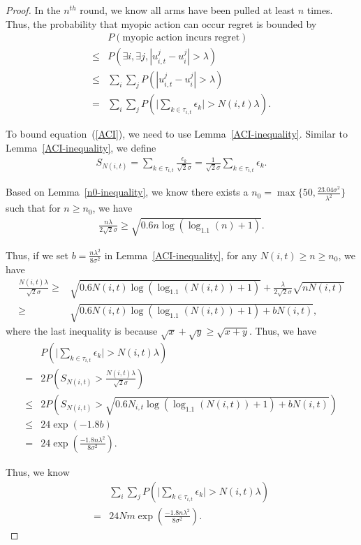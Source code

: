 \documentclass{article}
\begin{document}
\begin{proof}
In the $n^{th}$ round, we know all arms have been pulled at least $n$ times. Thus, the probability that myopic action can occur regret is bounded by
\begin{align}
&P(\text{myopic action incurs regret})\nonumber \\
\leq &P(\exists i, \exists j, |u_{i,t}^{j}-u_{i}^{j}|>\lambda) \nonumber \\
\leq & \sum_{i}\sum_{j} P(|u_{i,t}^{j}-u_{i}^{j}|>\lambda) \nonumber \\
= &  \sum_{i}\sum_{j} P\left(\bigg|\sum_{k\in \tau_{i,t}}\epsilon_{k}\bigg|>N(i,t)\lambda\right). \label{ACI}
\end{align}

To bound equation~(\ref{ACI}), we need to use Lemma~\ref{ACI-inequality}. Similar to Lemma~\ref{ACI-inequality}, we define
\begin{align}
S_{N(i,t)}=\sum_{k\in\tau_{i,t}}\frac{\epsilon_{k}}{\sqrt{2}\sigma}=\frac{1}{\sqrt{2}\sigma}\sum_{k\in\tau_{i,t}}\epsilon_{k}. \nonumber
\end{align}

Based on Lemma~\ref{n0-inequality}, we know there exists a $n_{0}=\max\{50, \frac{23.04\sigma^2}{\lambda^2}\}$ such that for $n\geq n_{0}$, we have
\begin{align}
\frac{n\lambda}{2\sqrt{2}\sigma}\geq \sqrt{0.6n\log(\log_{1.1}(n)+1)}. \nonumber
\end{align}

Thus, if we set $b=\frac{n\lambda^2}{8\sigma^2}$ in Lemma~\ref{ACI-inequality}, for any $N(i,t)\geq n\geq n_{0}$, we have
\begin{align}
\frac{N(i,t)\lambda}{\sqrt{2}\sigma}\geq & \sqrt{0.6N(i,t)\log(\log_{1.1}(N(i,t))+1)}+\frac{\lambda}{2\sqrt{2}\sigma}\sqrt{n N(i,t)} \nonumber \\
\geq & \sqrt{0.6N(i,t)\log(\log_{1.1}(N(i,t))+1)+bN(i,t)}, \nonumber 
\end{align}
where the last inequality is because $\sqrt{x}+\sqrt{y}\geq \sqrt{x+y}$. Thus, we have
\begin{align}
&P\left(\bigg|\sum_{k\in \tau_{i,t}}\epsilon_{k}\bigg|>N(i,t)\lambda\right) \nonumber \\
=&2P\left(S_{N(i,t)}>\frac{N(i,t)\lambda}{\sqrt{2}\sigma}\right) \nonumber \\
\leq & 2P\left(S_{N(i,t)}> \sqrt{0.6 N_{i,t}\log(\log_{1.1}(N(i,t))+1)+b N(i,t)}\right) \nonumber \\
\leq & 24\exp( -1.8b) \nonumber \\
= & 24\exp\left(\frac{-1.8 n\lambda^2}{8\sigma^2}\right). \nonumber
\end{align}


Thus, we know
\begin{align}
&\sum_{i}\sum_{j} P\left(\bigg|\sum_{k\in \tau_{i,t}}\epsilon_{k}\bigg|>N(i,t)\lambda\right)  \nonumber \\
=& 24Nm \exp\left(\frac{-1.8 n\lambda^2}{8\sigma^2}\right). \nonumber
\end{align}

\end{proof}
\end{document}
